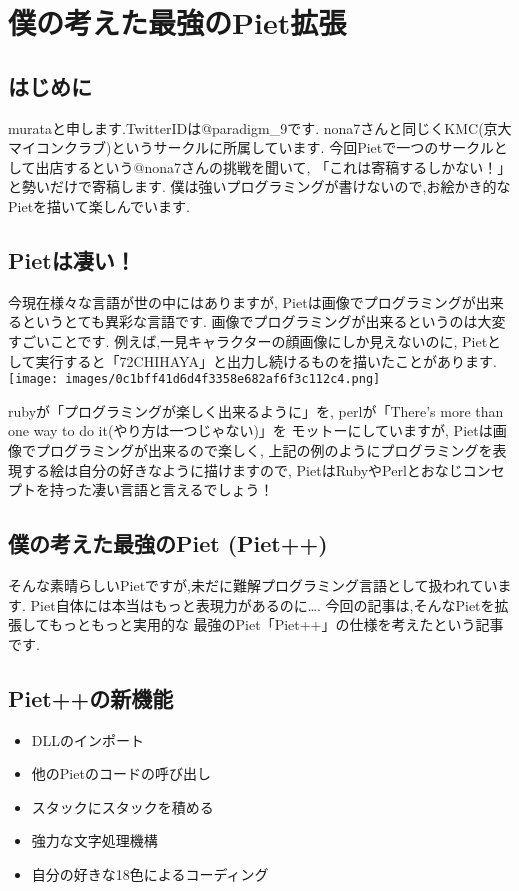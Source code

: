 \chapter{僕の考えた最強のPiet拡張}

\section{はじめに}

murataと申します.TwitterIDは@paradigm\_9です.
nona7さんと同じくKMC(京大マイコンクラブ)というサークルに所属しています.
今回Pietで一つのサークルとして出店するという@nona7さんの挑戦を聞いて,
「これは寄稿するしかない！」と勢いだけで寄稿します.
僕は強いプログラミングが書けないので,お絵かき的なPietを描いて楽しんでいます.

\section{Pietは凄い！}

今現在様々な言語が世の中にはありますが,
Pietは画像でプログラミングが出来るというとても異彩な言語です.
画像でプログラミングが出来るというのは大変すごいことです.
例えば,一見キャラクターの顔画像にしか見えないのに,
Pietとして実行すると「72CHIHAYA」と出力し続けるものを描いたことがあります.\\\texttt{[image: images/0c1bff41d6d4f3358e682af6f3c112c4.png]}

rubyが「プログラミングが楽しく出来るように」を, perlが「There's more
than one way to do it(やり方は一つじゃない)」を モットーにしていますが,
Pietは画像でプログラミングが出来るので楽しく,
上記の例のようにプログラミングを表現する絵は自分の好きなように描けますので,
PietはRubyやPerlとおなじコンセプトを持った凄い言語と言えるでしょう！

\section{僕の考えた最強のPiet (Piet++)}

そんな素晴らしいPietですが,未だに難解プログラミング言語として扱われています.
Piet自体には本当はもっと表現力があるのに\ldots{}.
今回の記事は,そんなPietを拡張してもっともっと実用的な
最強のPiet「Piet++」の仕様を考えたという記事です.

\section{Piet++の新機能}

\begin{itemize}
\item
  DLLのインポート
\item
  他のPietのコードの呼び出し
\item
  スタックにスタックを積める
\item
  強力な文字処理機構
\item
  自分の好きな18色によるコーディング
\end{itemize}


